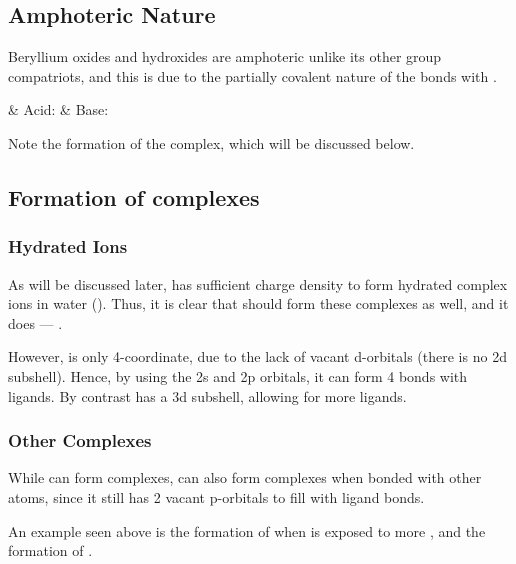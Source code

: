

		\subsection{Amphoteric Nature}

			Beryllium oxides and hydroxides are amphoteric unlike its other group \rtwo{} compatriots, and
			this is due to the partially covalent nature of the bonds with .

			\begin{bulletlist}
				& Acid:\tabto{15mm} 
				& Base:\tabto{15mm} 
			\end{bulletlist}

			Note the formation of the  complex, which will be discussed below.



		\subsection{Formation of  complexes}

			\subsubsection{Hydrated Ions}

				As will be discussed later,  has sufficient charge density to form hydrated complex
				ions in water (). Thus, it is clear that  should form these complexes
				as well, and it does --- .

				However,  is only 4-coordinate, due to the lack of vacant d-orbitals (there is no 2d
				subshell). Hence, by using the 2s and 2p orbitals, it can form 4 bonds with ligands. By contrast
				 has a 3d subshell, allowing for more ligands.



			\pagebreak
			\subsubsection{Other Complexes}

				While  can form complexes,  can also form complexes when bonded with other
				atoms, since it still has 2 vacant p-orbitals to fill with ligand bonds.

				An example seen above is the formation of  when  is exposed to
				more , and the formation of .

